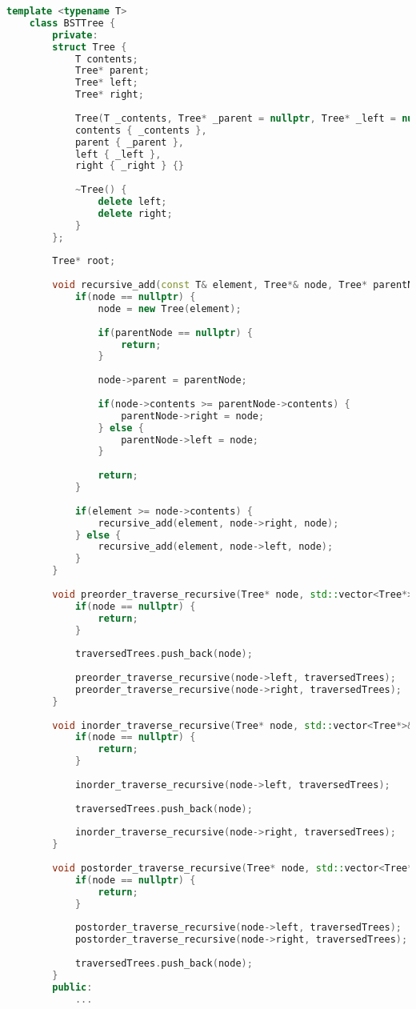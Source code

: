 \begin{lstlisting}[caption=Deklaracja drzewa BST, label={lst:BSTprivate}, language=C++]
	template <typename T>
	class BSTTree {
		private:
		struct Tree {
			T contents;
			Tree* parent;
			Tree* left;
			Tree* right;
			
			Tree(T _contents, Tree* _parent = nullptr, Tree* _left = nullptr, Tree* _right = nullptr):
			contents { _contents },
			parent { _parent },
			left { _left },
			right { _right } {}
			
			~Tree() {
				delete left;
				delete right;
			}
		};
		
		Tree* root;
		
		void recursive_add(const T& element, Tree*& node, Tree* parentNode = nullptr) {
			if(node == nullptr) {
				node = new Tree(element);
				
				if(parentNode == nullptr) {
					return;
				}
				
				node->parent = parentNode;
				
				if(node->contents >= parentNode->contents) {
					parentNode->right = node;
				} else {
					parentNode->left = node;
				}
				
				return;
			}
			
			if(element >= node->contents) {
				recursive_add(element, node->right, node);
			} else {
				recursive_add(element, node->left, node);
			}	
		}
		
		void preorder_traverse_recursive(Tree* node, std::vector<Tree*>& traversedTrees) {
			if(node == nullptr) {
				return;
			}
			
			traversedTrees.push_back(node);
			
			preorder_traverse_recursive(node->left, traversedTrees);
			preorder_traverse_recursive(node->right, traversedTrees);
		}
		
		void inorder_traverse_recursive(Tree* node, std::vector<Tree*>& traversedTrees) {
			if(node == nullptr) {
				return;
			}
			
			inorder_traverse_recursive(node->left, traversedTrees);
			
			traversedTrees.push_back(node);
			
			inorder_traverse_recursive(node->right, traversedTrees);
		}
		
		void postorder_traverse_recursive(Tree* node, std::vector<Tree*>& traversedTrees) {
			if(node == nullptr) {
				return;
			}
			
			postorder_traverse_recursive(node->left, traversedTrees);
			postorder_traverse_recursive(node->right, traversedTrees);
			
			traversedTrees.push_back(node);
		}
		public:
			...
\end{lstlisting}

